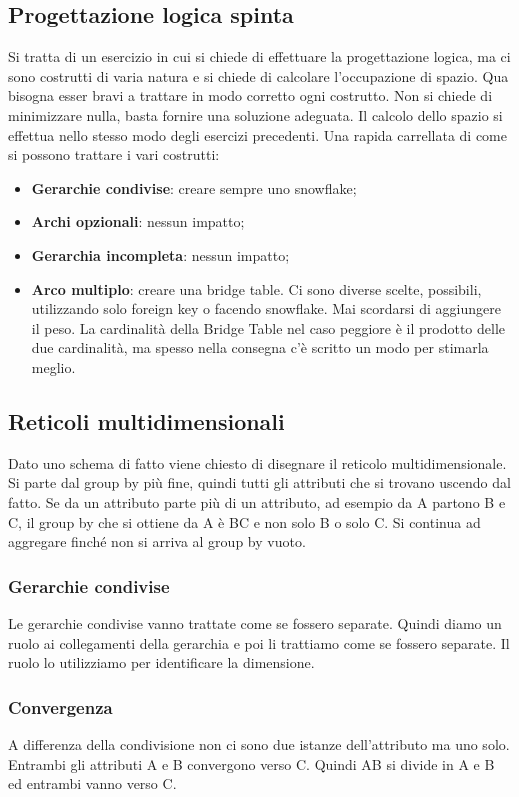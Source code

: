 \subsection{Progettazione logica spinta}
Si tratta di un esercizio in cui si chiede di effettuare la progettazione logica, ma ci sono costrutti di varia natura e si chiede di calcolare l'occupazione di spazio. Qua bisogna esser bravi a trattare in modo corretto ogni costrutto. Non si chiede di minimizzare nulla, basta fornire una soluzione adeguata. Il calcolo dello spazio si effettua nello stesso modo degli esercizi precedenti. Una rapida carrellata di come si possono trattare i vari costrutti:
\begin{itemize}
	\item \textbf{Gerarchie condivise}: creare sempre uno snowflake;
	\item \textbf{Archi opzionali}: nessun impatto;
	\item \textbf{Gerarchia incompleta}: nessun impatto;
	\item \textbf{Arco multiplo}: creare una bridge table. Ci sono diverse scelte, possibili, utilizzando solo foreign key o facendo snowflake. Mai scordarsi di aggiungere il peso. La cardinalità della Bridge Table nel caso peggiore è il prodotto delle due cardinalità, ma spesso nella consegna c'è scritto un modo per stimarla meglio.
\end{itemize}
\subsection{Reticoli multidimensionali}
\label{retmul}
Dato uno schema di fatto viene chiesto di disegnare il reticolo multidimensionale. Si parte dal group by più fine, quindi tutti gli attributi che si trovano uscendo dal fatto. Se da un attributo parte più di un attributo, ad esempio da A partono B e C, il group by che si ottiene da A è BC e non solo B o solo C. Si continua ad aggregare finché non si arriva al group by vuoto.
\subsubsection{Gerarchie condivise}
Le gerarchie condivise vanno trattate come se fossero separate. Quindi diamo un ruolo ai collegamenti della gerarchia e poi li trattiamo come se fossero separate. Il ruolo lo utilizziamo per identificare la dimensione.
\subsubsection{Convergenza}
A differenza della condivisione non ci sono due istanze dell'attributo ma uno solo. Entrambi gli attributi A e B convergono verso C. Quindi AB si divide in A e B ed entrambi vanno verso C.
